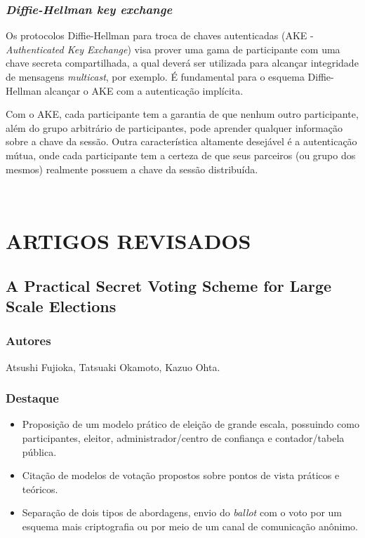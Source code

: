 \documentclass[letterpaper, 12 pt, conference]{ieeeconf}
\begin{document}
    \subsection{\textit{Diffie-Hellman key exchange}}
        Os protocolos Diffie-Hellman para troca de chaves autenticadas (AKE - \textit{Authenticated Key Exchange}) visa prover uma gama de participante com uma chave secreta compartilhada, a qual deverá ser utilizada para alcançar integridade de mensagens \textit{multicast}, por exemplo. É fundamental para o esquema Diffie-Hellman alcançar o AKE com a autenticação implícita. 
        
        Com o AKE, cada participante tem a garantia de que nenhum outro participante, além do grupo arbitrário de participantes, pode aprender qualquer informação sobre a chave da sessão. Outra característica altamente desejável é a autenticação mútua, onde cada participante tem a certeza de que seus parceiros (ou grupo dos mesmos) realmente possuem a chave da sessão distribuída. \cite{bresson2001provably}
        
    \\
\chapter{\textbf{ARTIGOS REVISADOS}}

\section{A Practical Secret Voting Scheme for Large Scale Elections}\label{I}
    \subsection{Autores}
        Atsushi Fujioka, Tatsuaki Okamoto, Kazuo Ohta.
    \subsection{Destaque}\label{I.B}
        \begin{itemize}
            \item Proposição de um modelo prático de eleição de grande escala, possuindo como participantes, eleitor, administrador/centro de confiança e contador/tabela pública.
            \item Citação de modelos de votação propostos sobre pontos de vista práticos e teóricos.
            \item Separação de dois tipos de abordagens, envio do \textit{ballot} com o voto por um esquema mais criptografia ou por meio de um canal de comunicação anônimo.
        \end{itemize}
\end{document}
